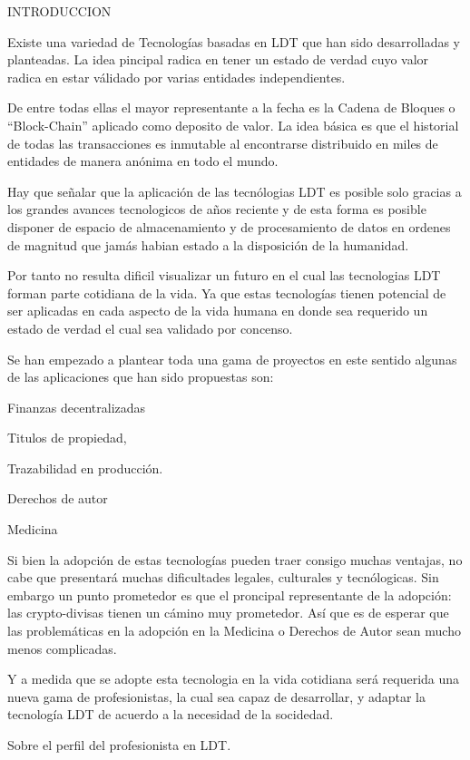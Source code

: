 \documentclass[a4paper,11pt,twoside]{article}
\begin{document}
INTRODUCCION


Existe  una variedad de Tecnologías basadas en LDT que han sido  desarrolladas y planteadas. La idea pincipal radica en tener un estado de verdad cuyo valor radica en estar válidado por varias entidades independientes.

De entre todas ellas el mayor representante a la fecha es la Cadena de Bloques o “Block-Chain” aplicado como deposito de valor. La idea básica es que el historial de todas las transacciones es inmutable al encontrarse distribuido en miles de entidades  de manera anónima en todo el mundo.


Hay que señalar que la aplicación de las tecnólogias  LDT es posible solo gracias a los grandes avances tecnologicos  de años reciente y  de esta forma es posible disponer de espacio de almacenamiento y de procesamiento de datos en ordenes de magnitud que jamás habian estado a la disposición de la humanidad. 


Por tanto no resulta dificil visualizar un futuro en el cual  las tecnologias LDT forman parte cotidiana de la vida.  Ya que estas tecnologías tienen potencial de ser aplicadas en cada  aspecto de la vida humana en donde sea requerido un estado de verdad  el cual sea validado por concenso.

Se han empezado a plantear toda una gama de proyectos en este sentido algunas de las aplicaciones que han sido propuestas son:

Finanzas decentralizadas

Titulos de propiedad, 

Trazabilidad en producción.

Derechos de autor

Medicina


Si bien la adopción de estas tecnologías pueden traer consigo muchas ventajas, no cabe  que  presentará muchas dificultades legales, culturales y tecnólogicas. Sin embargo un punto prometedor es que el proncipal representante de la adopción: las crypto-divisas tienen un cámino muy prometedor. Así que es de esperar que las problemáticas en la adopción en la Medicina o Derechos de Autor sean mucho menos complicadas. 

Y a medida que se adopte esta tecnologia en la vida cotidiana será requerida una nueva gama de profesionistas, la cual sea capaz de desarrollar, y adaptar la tecnología LDT  de acuerdo a la necesidad de la socidedad. 

Sobre el perfil del profesionista en LDT.
\end{document}
